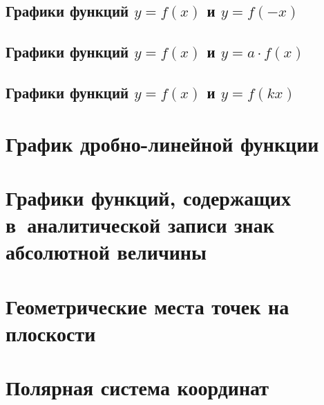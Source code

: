 \documentclass[14pt, oneside]{extbook}
\begin{document}
\subsection{Графики функций $y = f(x)$ и $y = f(-x)$}
\label{sec_1_10_5}
\subsection{Графики функций $y = f(x)$ и $y = a \cdot f(x)$}

\subsection{Графики функций $y = f(x)$ и $y = f(kx)$}

\section{График дробно-линейной функции}\label{sec_1_11}
\label{sec_1_11}
\section{Графики функций, содержащих в~аналитической записи знак абсолютной величины}

\section{Геометрические места точек на плоскости}

\section{Полярная система координат}

\end{document}
